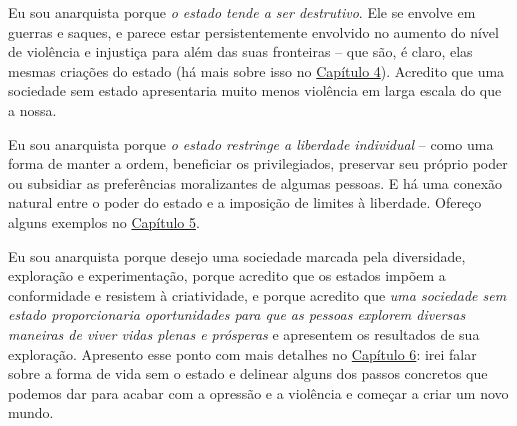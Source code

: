 Eu sou anarquista porque \emph{o estado tende a ser destrutivo}. Ele se envolve em guerras e saques, e parece estar persistentemente envolvido no aumento do nível de violência e injustiça para além das suas fronteiras -- que são, é claro, elas mesmas criações do estado (há mais sobre isso no \hyperref[chap:4]{Capítulo 4}). Acredito que uma sociedade sem estado apresentaria muito menos violência em larga escala do que a nossa.

Eu sou anarquista porque \emph{o estado restringe a liberdade individual} -- como uma forma de manter a ordem, beneficiar os privilegiados, preservar seu próprio poder ou subsidiar as preferências moralizantes de algumas pessoas. E há uma conexão natural entre o poder do estado e a imposição de limites à liberdade. Ofereço alguns exemplos no \hyperref[chap:5]{Capítulo 5}.

Eu sou anarquista porque desejo uma sociedade marcada pela diversidade, exploração e experimentação, porque acredito que os estados impõem a conformidade e resistem à criatividade, e porque acredito que \emph{uma sociedade sem estado proporcionaria oportunidades para que as pessoas explorem diversas maneiras de viver vidas plenas e prósperas} e apresentem os resultados de sua exploração. Apresento esse ponto com mais detalhes no \hyperref[chap:6]{Capítulo 6}: irei falar sobre a forma de vida sem o estado e delinear alguns dos passos concretos que podemos dar para acabar com a opressão e a violência e começar a criar um novo mundo.